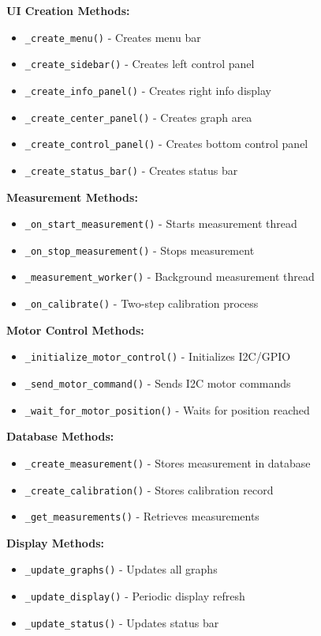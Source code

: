 \documentclass[11pt,a4paper]{article}
\begin{document}
\textbf{UI Creation Methods:}
\begin{itemize}
    \item \texttt{\_create\_menu()} - Creates menu bar
    \item \texttt{\_create\_sidebar()} - Creates left control panel
    \item \texttt{\_create\_info\_panel()} - Creates right info display
    \item \texttt{\_create\_center\_panel()} - Creates graph area
    \item \texttt{\_create\_control\_panel()} - Creates bottom control panel
    \item \texttt{\_create\_status\_bar()} - Creates status bar
\end{itemize}

\textbf{Measurement Methods:}
\begin{itemize}
    \item \texttt{\_on\_start\_measurement()} - Starts measurement thread
    \item \texttt{\_on\_stop\_measurement()} - Stops measurement
    \item \texttt{\_measurement\_worker()} - Background measurement thread
    \item \texttt{\_on\_calibrate()} - Two-step calibration process
\end{itemize}

\textbf{Motor Control Methods:}
\begin{itemize}
    \item \texttt{\_initialize\_motor\_control()} - Initializes I2C/GPIO
    \item \texttt{\_send\_motor\_command()} - Sends I2C motor commands
    \item \texttt{\_wait\_for\_motor\_position()} - Waits for position reached
\end{itemize}

\textbf{Database Methods:}
\begin{itemize}
    \item \texttt{\_create\_measurement()} - Stores measurement in database
    \item \texttt{\_create\_calibration()} - Stores calibration record
    \item \texttt{\_get\_measurements()} - Retrieves measurements
\end{itemize}

\textbf{Display Methods:}
\begin{itemize}
    \item \texttt{\_update\_graphs()} - Updates all graphs
    \item \texttt{\_update\_display()} - Periodic display refresh
    \item \texttt{\_update\_status()} - Updates status bar
\end{itemize}
\end{document}
